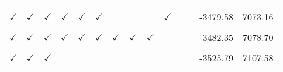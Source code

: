 \begin{table}[!h]
\begin{tabular}[t]{llllllllllllrr}
\cellcolor{gray!10}{$\checkmark$} & \cellcolor{gray!10}{$\checkmark$} & \cellcolor{gray!10}{$\checkmark$} & \cellcolor{gray!10}{$\checkmark$} & \cellcolor{gray!10}{$\checkmark$} & \cellcolor{gray!10}{$\checkmark$} & \cellcolor{gray!10}{} & \cellcolor{gray!10}{} & \cellcolor{gray!10}{} & \cellcolor{gray!10}{} & \cellcolor{gray!10}{$\checkmark$} & \cellcolor{gray!10}{} & \cellcolor{gray!10}{-3486.15} & \cellcolor{gray!10}{7072.30}\\
$\checkmark$ & $\checkmark$ & $\checkmark$ & $\checkmark$ & $\checkmark$ & $\checkmark$ &  &  &  & $\checkmark$ &  &  & -3479.58 & 7073.16\\
\cellcolor{gray!10}{$\checkmark$} & \cellcolor{gray!10}{$\checkmark$} & \cellcolor{gray!10}{$\checkmark$} & \cellcolor{gray!10}{$\checkmark$} & \cellcolor{gray!10}{$\checkmark$} & \cellcolor{gray!10}{$\checkmark$} & \cellcolor{gray!10}{$\checkmark$} & \cellcolor{gray!10}{$\checkmark$} & \cellcolor{gray!10}{} & \cellcolor{gray!10}{} & \cellcolor{gray!10}{} & \cellcolor{gray!10}{} & \cellcolor{gray!10}{-3482.62} & \cellcolor{gray!10}{7073.24}\\
$\checkmark$ & $\checkmark$ & $\checkmark$ & $\checkmark$ & $\checkmark$ & $\checkmark$ & $\checkmark$ & $\checkmark$ & $\checkmark$ &  &  &  & -3482.35 & 7078.70\\
\cellcolor{gray!10}{$\checkmark$} & \cellcolor{gray!10}{$\checkmark$} & \cellcolor{gray!10}{$\checkmark$} & \cellcolor{gray!10}{$\checkmark$} & \cellcolor{gray!10}{} & \cellcolor{gray!10}{} & \cellcolor{gray!10}{} & \cellcolor{gray!10}{} & \cellcolor{gray!10}{} & \cellcolor{gray!10}{} & \cellcolor{gray!10}{} & \cellcolor{gray!10}{} & \cellcolor{gray!10}{-3506.38} & \cellcolor{gray!10}{7090.76}\\
$\checkmark$ & $\checkmark$ & $\checkmark$ &  &  &  &  &  &  &  &  &  & -3525.79 & 7107.58\\
\bottomrule
\end{tabular}
\end{table}
